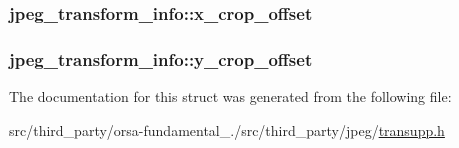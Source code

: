 \subsubsection[{x\+\_\+crop\+\_\+offset}]{ jpeg\+\_\+transform\+\_\+info\+::x\+\_\+crop\+\_\+offset}\label{structjpeg__transform__info_ad96a77528f72b2251b94d04ae396b435}
\hypertarget{structjpeg__transform__info_adeadce805b25751fd43263e2fcd2e166}{}
\subsubsection[{y\+\_\+crop\+\_\+offset}]{ jpeg\+\_\+transform\+\_\+info\+::y\+\_\+crop\+\_\+offset}\label{structjpeg__transform__info_adeadce805b25751fd43263e2fcd2e166}


The documentation for this struct was generated from the following file\+:\begin{DoxyCompactItemize}
\item 
src/third\+\_\+party/orsa-\/fundamental\+\_./src/third\+\_\+party/jpeg/\hyperlink{transupp_8h}{transupp.\+h}\end{DoxyCompactItemize}
